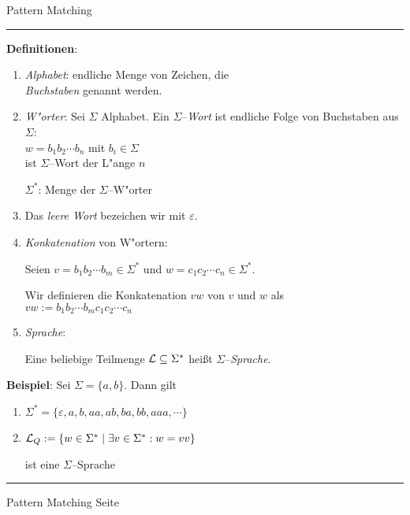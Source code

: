 \documentclass{slides}
\newcounter{mypage}
\begin{document}
\begin{center}
Pattern Matching
\end{center}


\rule{17cm}{1mm}

\footnotesize
\textbf{Definitionen}:
\begin{enumerate}
\item \emph{Alphabet}: endliche Menge von Zeichen, die \\
      \emph{Buchstaben} genannt werden.
\item \emph{W"orter}:  Sei $\Sigma$ Alphabet.  Ein $\Sigma$--\emph{Wort} ist endliche Folge von
      Buchstaben aus $\Sigma$: \\[0.3cm]
      \hspace*{1.3cm} $w = b_1b_2 \cdots b_n$ \quad mit $b_i \in \Sigma$ \\[0.3cm]
      ist $\Sigma$--Wort der L"ange $n$

      $\Sigma^*$: Menge der $\Sigma$--W"orter
\item Das \emph{leere Wort} bezeichen wir mit $\varepsilon$.
\item \emph{Konkatenation} von W"ortern: 

      Seien $v=b_1b_2 \cdots b_m \in \Sigma^*$ und $w=c_1c_2 \cdots c_n \in \Sigma^*$.

      Wir definieren die Konkatenation $vw$ von $v$ und $w$ als \\[0.3cm]
      \hspace*{1.3cm} $vw := b_1b_2 \cdots b_mc_1c_2 \cdots c_n$
\item \emph{Sprache}:

      Eine beliebige Teilmenge ${\cal L} \subseteq \Sigma^*$ hei{\ss}t $\Sigma$--\emph{Sprache}.
\end{enumerate}
\textbf{Beispiel}: Sei $\Sigma = \{a,b\}$.  Dann gilt 
\begin{enumerate}
\item $\Sigma^* = \{ \varepsilon, a, b, aa, ab, ba, bb, aaa, \cdots \}$ 
\item ${\cal L}_{Q} := \{ w \in \Sigma^* \;|\; \exists v \in \Sigma^*: w = vv \}$ 

      ist eine $\Sigma$--Sprache
\end{enumerate}
\hspace*{1.3cm} 


\vspace*{0.2cm}

\scriptsize

\vspace*{\fill}
\tiny \addtocounter{mypage}{1}
\rule{17cm}{1mm}
Pattern Matching  \hspace*{\fill} Seite 



\end{document}
